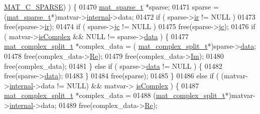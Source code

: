 \begin{DoxyCode}
{{{{{{{{{{{{{{{{{{{{{{{{{{{{{{      \hyperlink{group___m_a_t_ggad4d60ae7b709fc81bfd744fb4c857c40a0d5655b7e6178a2242cb3bb56ff4c8d2}{MAT\_C\_SPARSE}) ) \{
01470                 \hyperlink{group___m_a_t_structmat__sparse__t}{mat\_sparse\_t} *sparse;
01471                 sparse = (\hyperlink{group___m_a_t_structmat__sparse__t}{mat\_sparse\_t}*)matvar->\hyperlink{group___m_a_t_a6e97e3ed9f40c49322c18561c2a94e92}{internal}->data;
01472                 if ( sparse->\hyperlink{group___m_a_t_a8d4c863d704edddec5cbfa15b2d719c8}{ir} != NULL )
01473                     free(sparse->\hyperlink{group___m_a_t_a8d4c863d704edddec5cbfa15b2d719c8}{ir});
01474                 \textcolor{keywordflow}{if} ( sparse->\hyperlink{group___m_a_t_ad1e74cdc4f7eff1e47a670297c01da4b}{jc} != NULL )
01475                     free(sparse->\hyperlink{group___m_a_t_ad1e74cdc4f7eff1e47a670297c01da4b}{jc});
01476                 \textcolor{keywordflow}{if} ( matvar->\hyperlink{group___m_a_t_aeb03b3a69f108dc05470b00443a43739}{isComplex} && NULL != sparse->\hyperlink{group___m_a_t_ae2c648cb9eac4ce47f26cddb44246152}{data} ) \{
01477                     \hyperlink{group___m_a_t_structmat__complex__split__t}{mat\_complex\_split\_t} *complex\_data = (
      \hyperlink{group___m_a_t_structmat__complex__split__t}{mat\_complex\_split\_t}*)sparse->\hyperlink{group___m_a_t_ae2c648cb9eac4ce47f26cddb44246152}{data};
01478                     free(complex\_data->\hyperlink{group___m_a_t_a484a93607508adac2bce53a0252e0325}{Re});
01479                     free(complex\_data->\hyperlink{group___m_a_t_a7182d10b0d3598415887376065440946}{Im});
01480                     free(complex\_data);
01481                 \} \textcolor{keywordflow}{else} \textcolor{keywordflow}{if} ( sparse->\hyperlink{group___m_a_t_ae2c648cb9eac4ce47f26cddb44246152}{data} != NULL ) \{
01482                     free(sparse->\hyperlink{group___m_a_t_ae2c648cb9eac4ce47f26cddb44246152}{data});
01483                 \}
01484                 free(sparse);
01485             \}
01486             \textcolor{keywordflow}{else} \textcolor{keywordflow}{if} ( (matvar->\hyperlink{group___m_a_t_a6e97e3ed9f40c49322c18561c2a94e92}{internal}->data != NULL) && matvar->
      \hyperlink{group___m_a_t_aeb03b3a69f108dc05470b00443a43739}{isComplex} ) \{
01487                 \hyperlink{group___m_a_t_structmat__complex__split__t}{mat\_complex\_split\_t} *complex\_data =
01488                     (\hyperlink{group___m_a_t_structmat__complex__split__t}{mat\_complex\_split\_t}*)matvar->\hyperlink{group___m_a_t_a6e97e3ed9f40c49322c18561c2a94e92}{internal}->data;
01489                 free(complex\_data->\hyperlink{group___m_a_t_a484a93607508adac2bce53a0252e0325}{Re});
}}}}}}}}}}}}}}}}}}}}}}}}}}}}}}
\end{DoxyCode}
